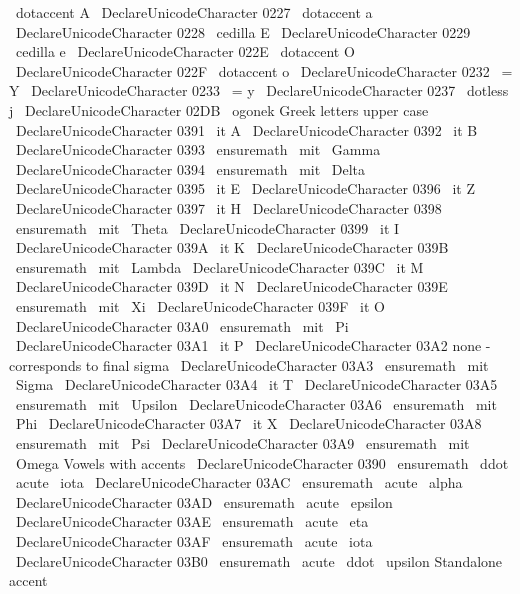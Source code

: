 {{{{{{}
{
\
dotaccent
{
A
}
}
%
\
DeclareUnicodeCharacter
{
0227
}
{
\
dotaccent
{
a
}
}
%
\
DeclareUnicodeCharacter
{
0228
}
{
\
cedilla
{
E
}
}
%
\
DeclareUnicodeCharacter
{
0229
}
{
\
cedilla
{
e
}
}
%
\
DeclareUnicodeCharacter
{
022E
}
{
\
dotaccent
{
O
}
}
%
\
DeclareUnicodeCharacter
{
022F
}
{
\
dotaccent
{
o
}
}
%
%
\
DeclareUnicodeCharacter
{
0232
}
{
\
=
Y
}
%
\
DeclareUnicodeCharacter
{
0233
}
{
\
=
y
}
%
\
DeclareUnicodeCharacter
{
0237
}
{
\
dotless
{
j
}
}
%
%
\
DeclareUnicodeCharacter
{
02DB
}
{
\
ogonek
{
}
}
%
%
%
Greek
letters
upper
case
\
DeclareUnicodeCharacter
{
0391
}
{
{
\
it
A
}
}
%
\
DeclareUnicodeCharacter
{
0392
}
{
{
\
it
B
}
}
%
\
DeclareUnicodeCharacter
{
0393
}
{
\
ensuremath
{
\
mit
\
Gamma
}
}
%
\
DeclareUnicodeCharacter
{
0394
}
{
\
ensuremath
{
\
mit
\
Delta
}
}
%
\
DeclareUnicodeCharacter
{
0395
}
{
{
\
it
E
}
}
%
\
DeclareUnicodeCharacter
{
0396
}
{
{
\
it
Z
}
}
%
\
DeclareUnicodeCharacter
{
0397
}
{
{
\
it
H
}
}
%
\
DeclareUnicodeCharacter
{
0398
}
{
\
ensuremath
{
\
mit
\
Theta
}
}
%
\
DeclareUnicodeCharacter
{
0399
}
{
{
\
it
I
}
}
%
\
DeclareUnicodeCharacter
{
039A
}
{
{
\
it
K
}
}
%
\
DeclareUnicodeCharacter
{
039B
}
{
\
ensuremath
{
\
mit
\
Lambda
}
}
%
\
DeclareUnicodeCharacter
{
039C
}
{
{
\
it
M
}
}
%
\
DeclareUnicodeCharacter
{
039D
}
{
{
\
it
N
}
}
%
\
DeclareUnicodeCharacter
{
039E
}
{
\
ensuremath
{
\
mit
\
Xi
}
}
%
\
DeclareUnicodeCharacter
{
039F
}
{
{
\
it
O
}
}
%
\
DeclareUnicodeCharacter
{
03A0
}
{
\
ensuremath
{
\
mit
\
Pi
}
}
%
\
DeclareUnicodeCharacter
{
03A1
}
{
{
\
it
P
}
}
%
%
\
DeclareUnicodeCharacter
{
03A2
}
{
}
%
none
-
corresponds
to
final
sigma
\
DeclareUnicodeCharacter
{
03A3
}
{
\
ensuremath
{
\
mit
\
Sigma
}
}
%
\
DeclareUnicodeCharacter
{
03A4
}
{
{
\
it
T
}
}
%
\
DeclareUnicodeCharacter
{
03A5
}
{
\
ensuremath
{
\
mit
\
Upsilon
}
}
%
\
DeclareUnicodeCharacter
{
03A6
}
{
\
ensuremath
{
\
mit
\
Phi
}
}
%
\
DeclareUnicodeCharacter
{
03A7
}
{
{
\
it
X
}
}
%
\
DeclareUnicodeCharacter
{
03A8
}
{
\
ensuremath
{
\
mit
\
Psi
}
}
%
\
DeclareUnicodeCharacter
{
03A9
}
{
\
ensuremath
{
\
mit
\
Omega
}
}
%
%
%
Vowels
with
accents
\
DeclareUnicodeCharacter
{
0390
}
{
\
ensuremath
{
\
ddot
{
\
acute
\
iota
}
}
}
%
\
DeclareUnicodeCharacter
{
03AC
}
{
\
ensuremath
{
\
acute
\
alpha
}
}
%
\
DeclareUnicodeCharacter
{
03AD
}
{
\
ensuremath
{
\
acute
\
epsilon
}
}
%
\
DeclareUnicodeCharacter
{
03AE
}
{
\
ensuremath
{
\
acute
\
eta
}
}
%
\
DeclareUnicodeCharacter
{
03AF
}
{
\
ensuremath
{
\
acute
\
iota
}
}
%
\
DeclareUnicodeCharacter
{
03B0
}
{
\
ensuremath
{
\
acute
{
\
ddot
\
upsilon
}
}
}
%
%
%
Standalone
accent
}}}}}
